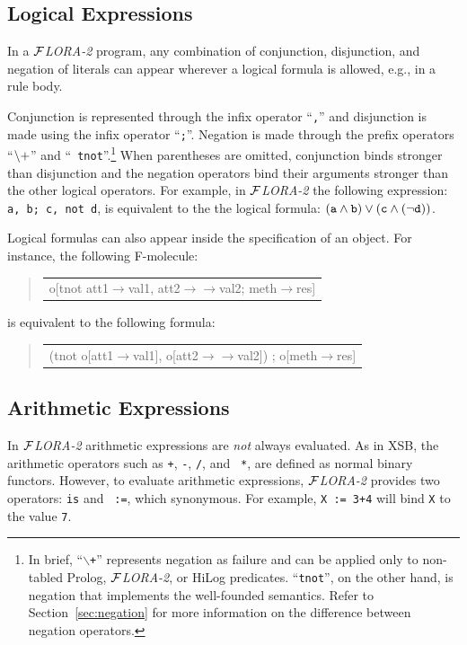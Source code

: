 \documentclass[11pt]{article}
\newenvironment{qrules}{\begin{quote}\tt\begin{tabular}[t]{l}}%
{\end{tabular}\end{quote}}
\newcommand{\fd}{\ensuremath{{\rightarrow}}}                   %
\newcommand{\mvd}{\ensuremath{{\rightarrow\!\!\!\!\rightarrow}}}  %
\newcommand{\FLORA}{{\mbox{${\cal F}${\small\it LORA}\rm\emph{-2}}}\xspace}
\newcommand{\NAF}{{$\tt\backslash +$}\xspace}
\begin{document}
\subsection{Logical Expressions}


%
In a \FLORA program, any combination of conjunction, disjunction, and
negation of literals can appear wherever a logical formula is allowed,
e.g., in a rule body.

Conjunction is represented through the infix operator ``{\tt ,}'' and
disjunction is made using the infix operator ``{\tt ;}''.  Negation is made
through the prefix operators ``\NAF'' and ``{\tt
  tnot}''.\footnote{
  In brief, ``{\tt $\backslash$+}'' represents negation as
  failure and can be applied only to non-tabled Prolog, \FLORA, or HiLog
  predicates. ``{\tt tnot}'', on the other hand, is negation that
  implements the well-founded semantics.  Refer to
  Section~\ref{sec:negation} for more information on the difference between
  negation operators. 
  }
When parentheses are omitted, conjunction binds stronger than disjunction
and the negation operators bind their arguments stronger than the other
logical operators.  For example, in \FLORA the following expression:
\verb|a, b; c, not d|, is equivalent to the the logical formula: $\tt (a
\wedge b) \vee (c \wedge (\neg d))$.

%
Logical formulas can also appear inside the specification of an object. For
instance, the following F-molecule:
\begin{qrules}
o[tnot att1{\fd}val1, att2{\mvd}val2; meth{\fd}res]
\end{qrules}
is equivalent to the following formula:
\begin{qrules}
(tnot o[att1{\fd}val1], o[att2{\mvd}val2]) ; o[meth{\fd}res]
\end{qrules}


\subsection{Arithmetic Expressions}


In \FLORA arithmetic expressions are \emph{not} always evaluated. As in
XSB, the arithmetic operators such as {\tt +}, {\tt -}, {\tt /}, and {\tt
  *}, are defined as normal binary functors. However, to evaluate
arithmetic expressions, \FLORA provides two operators: {\tt is} and {\tt
  :=}, which synonymous.  For example, {\tt X := 3+4} will bind {\tt X} to
the value {\tt 7}.
\end{document}
